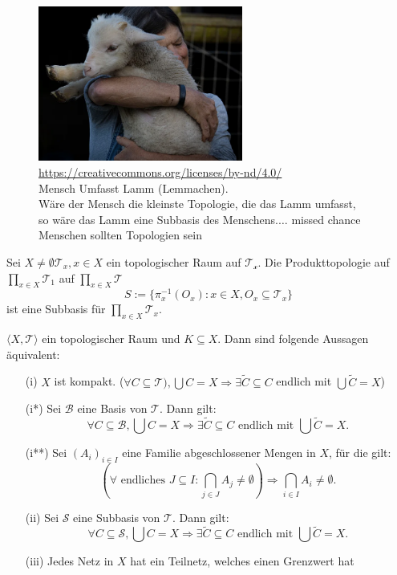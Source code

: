 \begin{figure}[h!]
 \centering
    \includegraphics[width=0.6\textwidth]{pictures/hug_lemma.png}
    \caption{\url{https://creativecommons.org/licenses/by-nd/4.0/}\\
    Mensch Umfasst Lamm (Lemmachen).\\
    Wäre der Mensch die kleinste Topologie, 
    die das Lamm umfasst,\\
    so wäre das Lamm eine Subbasis des Menschens.$\dots$ missed chance Menschen sollten Topologien sein}
 \end{figure}


 \ex{}
 {
Sei $X \neq \emptyset \mathcal{T}_x, x \in X$  ein topologischer Raum 
 auf $\mathcal{T_x}$.
 Die Produkttopologie auf $ \prod_{x \in X} \mathcal{T}_1$ auf 
 $\prod_{x \in X} \mathcal{T}$
 $$
 S:= \{ \pi_x^{-1}(O_x) : x \in X, O_x \subseteq \mathcal{T}_x \}
 $$
    ist eine Subbasis für $\prod_{x \in X} \mathcal{T}_x$.
 }

\thm{}
{
    $\langle X, \mathcal{T} \rangle$ ein topologischer Raum und 
    $K \subseteq X$. Dann sind folgende Aussagen äquivalent:
    \begin{itemize}
        \item[(i)] $X$ ist kompakt. 
        ($\forall C \subseteq \mathcal{T}), 
        \bigcup C = X \Rightarrow \exists \tilde{C} 
        \subseteq C$ endlich mit $\bigcup \tilde{C} = X$)
        \item[(i*)] Sei $\mathcal{B}$ eine Basis von $\mathcal{T}$.
        Dann gilt:
        $$
        \forall C \subseteq \mathcal{B}, 
        \bigcup C = X \Rightarrow \exists \tilde{C} 
        \subseteq C \text{ endlich mit } \bigcup \tilde{C} = X .
        $$
        \item[(i**)] Sei $(A_i)_{i \in I}$ eine Familie abgeschlossener 
        Mengen in 
        $X$, für die gilt:
        $$
        (\forall \text{ endliches } J \subseteq I :
        \bigcap_{j \in J} A_j \neq \emptyset) \Rightarrow
        \bigcap_{i \in I} A_i \neq \emptyset .
        $$
        \item[(ii)] Sei $\mathcal{S}$ eine Subbasis von $\mathcal{T}$.
        Dann gilt:
        $$
        \forall C \subseteq \mathcal{S}, 
        \bigcup C = X \Rightarrow \exists \tilde{C} 
        \subseteq C \text{ endlich mit } \bigcup \tilde{C} = X .
        $$  
        \item[(iii)] Jedes Netz in $X$ hat ein Teilnetz,
         welches einen Grenzwert hat
    \end{itemize}
}

